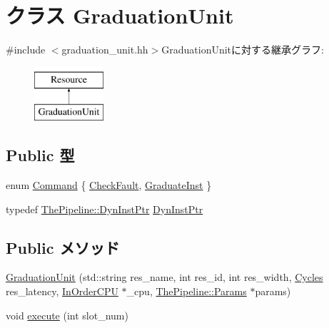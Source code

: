 \hypertarget{classGraduationUnit}{
\section{クラス GraduationUnit}
\label{classGraduationUnit}
}


{\ttfamily \#include $<$graduation\_\-unit.hh$>$}GraduationUnitに対する継承グラフ:\begin{figure}[H]
\begin{center}
\leavevmode
\includegraphics[height=2cm]{classGraduationUnit}
\end{center}
\end{figure}
\subsection*{Public 型}
\begin{DoxyCompactItemize}
\item 
enum \hyperlink{classGraduationUnit_a2afce0a47a93eee73a314d53e4890153}{Command} \{ \hyperlink{classGraduationUnit_a2afce0a47a93eee73a314d53e4890153af5078e6f13b238ab8060c96938d6072b}{CheckFault}, 
\hyperlink{classGraduationUnit_a2afce0a47a93eee73a314d53e4890153a0dbb578317cd51936a80b515cd969112}{GraduateInst}
 \}
\item 
typedef \hyperlink{classRefCountingPtr}{ThePipeline::DynInstPtr} \hyperlink{classGraduationUnit_af9d0c8a46736ba6aa2d8bb94da1a5e73}{DynInstPtr}
\end{DoxyCompactItemize}
\subsection*{Public メソッド}
\begin{DoxyCompactItemize}
\item 
\hyperlink{classGraduationUnit_a833d5b53b32caa0573f9df673f7348c4}{GraduationUnit} (std::string res\_\-name, int res\_\-id, int res\_\-width, \hyperlink{classCycles}{Cycles} res\_\-latency, \hyperlink{classInOrderCPU}{InOrderCPU} $\ast$\_\-cpu, \hyperlink{namespaceThePipeline_ab62ca16eeca26566ad2422b5df4943ce}{ThePipeline::Params} $\ast$params)
\item 
void \hyperlink{classGraduationUnit_a7b7fff82f8c9cbdb02add1346f60bb9e}{execute} (int slot\_\-num)
\end{DoxyCompactItemize}
